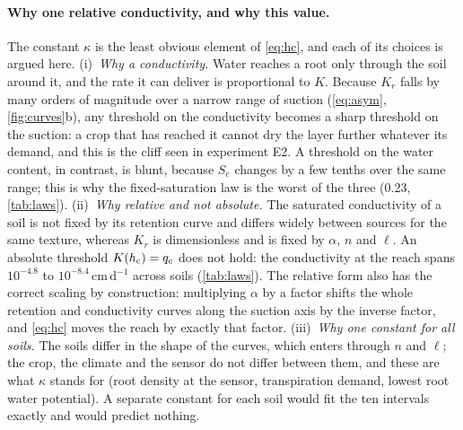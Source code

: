 \paragraph{Why one relative conductivity, and why this value.}
The constant $\kappa$ is the least obvious element of \cref{eq:hc}, and each of its choices is argued here. (i)~\emph{Why a conductivity.} Water reaches a root only through the soil around it, and the rate it can deliver is proportional to $K$. Because $K_r$ falls by many orders of magnitude over a narrow range of suction (\cref{eq:asym}, \cref{fig:curves}b), any threshold on the conductivity becomes a sharp threshold on the suction: a crop that has reached it cannot dry the layer further whatever its demand, and this is the cliff seen in experiment E2. A threshold on the water content, in contrast, is blunt, because $S_e$ changes by a few tenths over the same range; this is why the fixed-saturation law is the worst of the three (0.23, \cref{tab:laws}). (ii)~\emph{Why relative and not absolute.} The saturated conductivity of a soil is not fixed by its retention curve and differs widely between sources for the same texture, whereas $K_r$ is dimensionless and is fixed by $\alpha$, $n$ and $\ell$. An absolute threshold $K(h_{\mathrm{c}})=q_c$ does not hold: the conductivity at the reach spans $10^{-4.8}$ to $10^{-8.4}$\,cm\,d$^{-1}$ across soils (\cref{tab:laws}). The relative form also has the correct scaling by construction: multiplying $\alpha$ by a factor shifts the whole retention and conductivity curves along the suction axis by the inverse factor, and \cref{eq:hc} moves the reach by exactly that factor. (iii)~\emph{Why one constant for all soils.} The soils differ in the shape of the curves, which enters through $n$ and $\ell$; the crop, the climate and the sensor do not differ between them, and these are what $\kappa$ stands for (root density at the sensor, transpiration demand, lowest root water potential). A separate constant for each soil would fit the ten intervals exactly and would predict nothing.

